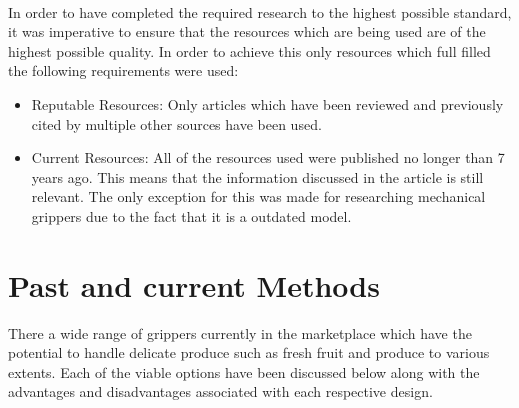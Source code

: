 \documentclass[11pt]{article}
\begin{document}
\\
\newline
In order to have completed the required research to the highest possible standard, it was imperative to ensure that the resources which are being used are of the highest possible quality. In order to achieve this only resources which full filled the following requirements were used:
\begin{itemize}
\item Reputable Resources: Only articles which have been reviewed and previously cited by multiple other sources have been used.
\item Current Resources: All of the resources used were published no longer than 7 years ago. This means that the information discussed in the article is still relevant. The only exception for this was made for researching mechanical grippers due to the fact that it is a outdated model.
\end{itemize}
\section{Past and current Methods}
There a wide range of grippers currently in the marketplace which have the potential to handle delicate produce such as fresh fruit and produce to various extents. Each of the viable options have been discussed below along with the advantages and disadvantages associated with each respective design.
\end{document}
